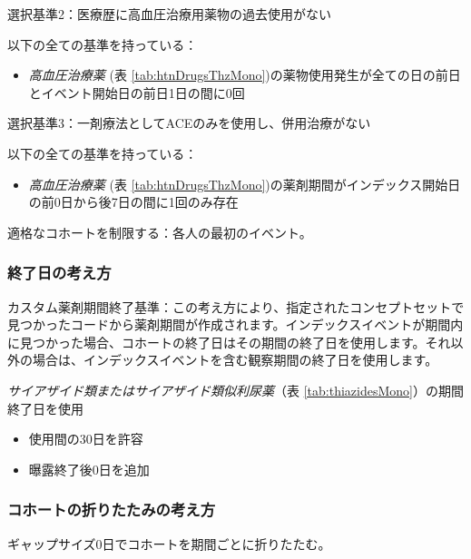\documentclass[
  11pt]{book}
\providecommand{\tightlist}{%
  \setlength{\itemsep}{0pt}\setlength{\parskip}{0pt}}
\theoremstyle{definition}
\theoremstyle{definition}
\theoremstyle{definition}
\theoremstyle{definition}
\theoremstyle{remark}
\begin{document}
選択基準2：医療歴に高血圧治療用薬物の過去使用がない

以下の全ての基準を持っている：

\begin{itemize}
\tightlist
\item
  \emph{高血圧治療薬} (表 \ref{tab:htnDrugsThzMono})の薬物使用発生が全ての日の前日とイベント開始日の前日1日の間に0回
\end{itemize}

選択基準3：一剤療法としてACEのみを使用し、併用治療がない

以下の全ての基準を持っている：

\begin{itemize}
\tightlist
\item
  \emph{高血圧治療薬} (表 \ref{tab:htnDrugsThzMono})の薬剤期間がインデックス開始日の前0日から後7日の間に1回のみ存在
\end{itemize}

適格なコホートを制限する：各人の最初のイベント。

\subsubsection*{終了日の考え方}\label{ux7d42ux4e86ux65e5ux306eux8003ux3048ux65b9-2}

カスタム薬剤期間終了基準：この考え方により、指定されたコンセプトセットで見つかったコードから薬剤期間が作成されます。インデックスイベントが期間内に見つかった場合、コホートの終了日はその期間の終了日を使用します。それ以外の場合は、インデックスイベントを含む観察期間の終了日を使用します。

\emph{サイアザイド類またはサイアザイド類似利尿薬}（表 \ref{tab:thiazidesMono}）の期間終了日を使用

\begin{itemize}
\tightlist
\item
  使用間の30日を許容
\item
  曝露終了後0日を追加
\end{itemize}

\subsubsection*{コホートの折りたたみの考え方}\label{ux30b3ux30dbux30fcux30c8ux306eux6298ux308aux305fux305fux307fux306eux8003ux3048ux65b9-1}

ギャップサイズ0日でコホートを期間ごとに折りたたむ。
\end{document}
